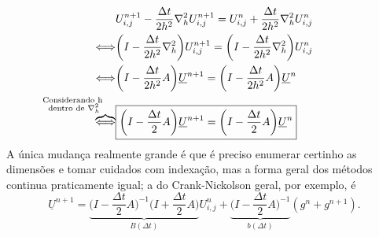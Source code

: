 \documentclass[../differential_methods.tex]{subfiles}
\begin{document}
\begin{align*}
	                    & U_{i, j}^{n+1} - \frac{\Delta t}{2h^{2}}\nabla_{h}^{2} U_{i, j}^{n+1} = U_{i, j}^{n} + \frac{\Delta t}{2h^{2}}\nabla_{h}^{2} U_{i, j}^{n} \\
	\Longleftrightarrow & \biggl(I-\frac{\Delta t}{2h^{2}}\nabla_{h}^{2}\biggr)U_{i, j}^{n+1} = \biggl(I-\frac{\Delta t}{2h^{2}}\nabla_{h}^{2}\biggr)U_{i, j}^{n}   \\
	\Longleftrightarrow & \biggl(I - \frac{\Delta t}{2h^{2}}A\biggr)\underline{U}^{n+1} = \biggl(I-\frac{\Delta t}{2h^{2}}A\biggr)\underline{U}^{n}                 \\
	\overbrace{\Longleftrightarrow}^{\mathllap{\substack{\text{Considerando h }                                                                                     \\ \text{dentro de }\nabla_{h}^{2}}}} & \boxed{\biggl(I - \frac{\Delta t}{2}A\biggr)\underline{U}^{n+1} = \biggl(I-\frac{\Delta t}{2}A\biggr)\underline{U}^{n}}                           \\
\end{align*}
A única mudança realmente grande é que é preciso enumerar certinho as dimensões e tomar cuidados com indexação, mas a forma geral dos métodos continua praticamente igual; a do Crank-Nickolson geral, por exemplo, é
\[
	\underline{U}^{n+1} = \underbrace{\biggl(I - \frac{\Delta t}{2}A\biggr)^{-1}\biggl(I + \frac{\Delta t}{2}A\biggr)}_{B(\Delta t)}U_{i, j}^{n} + \underbrace{\biggl(I - \frac{\Delta t}{2}A\biggr)^{-1}}_{b(\Delta t)}(g^{n} + g^{n+1}).
\]
\end{document}
